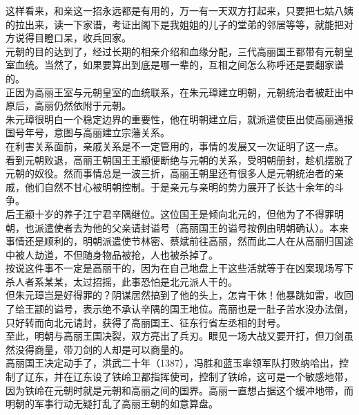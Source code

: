 \begin{multicols}{\theparacolNo}
这样看来，和亲这一招永远都是有用的，万一有一天双方打起来，只要把七姑八姨的拉出来，读一下家谱，考证出阁下是我姐姐的儿子的堂弟的邻居等等，就能把对方说得目瞪口呆，收兵回家。\\

元朝的目的达到了，经过长期的相亲介绍和血缘分配，三代高丽国王都带有元朝皇室血统。当然了，如果要算出到底是哪一辈的，互相之间怎么称呼还是要翻家谱的。\\

正因为高丽王室与元朝皇室的血统联系，在朱元璋建立明朝，元朝统治者被赶出中原后，高丽仍然依附于元朝。\\

朱元璋很明白一个稳定边界的重要性，他在明朝建立后，就派遣使臣出使高丽通报国号年号，意图与高丽建立宗藩关系。\\

在利害关系面前，亲戚关系是不一定管用的，事情的发展又一次证明了这一点。\\

看到元朝败退，高丽王朝国王王颛便断绝与元朝的关系，受明朝册封，趁机摆脱了元朝的奴役。然而事情总是一波三折，高丽王朝里还有很多人是元朝统治者的亲戚，他们自然不甘心被明朝控制。于是亲元与亲明的势力展开了长达十余年的斗争。\\

后王颛十岁的养子江宁君辛隅继位。这位国王是倾向北元的，但他为了不得罪明朝，也派遣使者去为他的父亲请封谥号（高丽国王的谥号按例由明朝确认）。本来事情还是顺利的，明朝派遣使节林密、蔡斌前往高丽，然而此二人在从高丽归国途中被人劫道，不但随身物品被抢，人也被杀掉了。\\

按说这件事不一定是高丽干的，因为在自己地盘上干这些活就等于在凶案现场写下杀人者系某某，太过招摇，此事恐怕是北元派人干的。\\

但朱元璋岂是好得罪的？阴谋居然搞到了他的头上，怎肯干休！他暴跳如雷，收回了给王颛的谥号，表示绝不承认辛隅的国王地位。高丽也是一肚子苦水没办法倒，只好转而向北元请封，获得了高丽国王、征东行省左丞相的封号。\\

至此，明朝与高丽王国决裂，双方亮出了兵刃。眼见一场大战又要开打，但刀剑虽然没得商量，带刀剑的人却是可以商量的。\\

高丽国王决定动手了，洪武二十年（1387），冯胜和蓝玉率领军队打败纳哈出，控制了辽东，并在辽东设了铁岭卫都指挥使司，控制了铁岭，这可是一个敏感地带，因为铁岭在元朝时就是元朝和高丽之间的国界。高丽一直想占据这个缓冲地带，而明朝的军事行动无疑打乱了高丽王朝的如意算盘。\\


\end{multicols}
